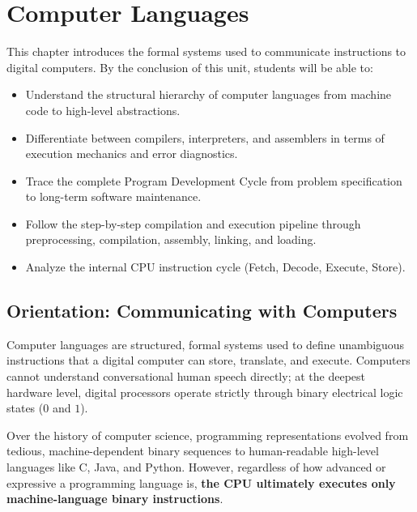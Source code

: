 \chapter{Computer Languages}
\label{chap:computer_languages}

\begin{tcolorbox}[enhanced, colback=boxnavybg, colframe=brandnavy, boxrule=1.2pt, arc=4pt, title={\Large\bfseries\sffamily Unit 1 Overview \& Learning Objectives}]
\sffamily\normalsize
This chapter introduces the formal systems used to communicate instructions to digital computers. By the conclusion of this unit, students will be able to:
\begin{itemize}[leftmargin=1.2em, itemsep=2pt, topsep=3pt]
    \item Understand the structural hierarchy of computer languages from machine code to high-level abstractions.
    \item Differentiate between compilers, interpreters, and assemblers in terms of execution mechanics and error diagnostics.
    \item Trace the complete Program Development Cycle from problem specification to long-term software maintenance.
    \item Follow the step-by-step compilation and execution pipeline through preprocessing, compilation, assembly, linking, and loading.
    \item Analyze the internal CPU instruction cycle (Fetch, Decode, Execute, Store).
\end{itemize}
\end{tcolorbox}

\section{Orientation: Communicating with Computers}

Computer languages are structured, formal systems used to define unambiguous instructions that a digital computer can store, translate, and execute. Computers cannot understand conversational human speech directly; at the deepest hardware level, digital processors operate strictly through binary electrical logic states ($0$ and $1$). 

Over the history of computer science, programming representations evolved from tedious, machine-dependent binary sequences to human-readable high-level languages like C, Java, and Python. However, regardless of how advanced or expressive a programming language is, \textbf{the CPU ultimately executes only machine-language binary instructions}.


